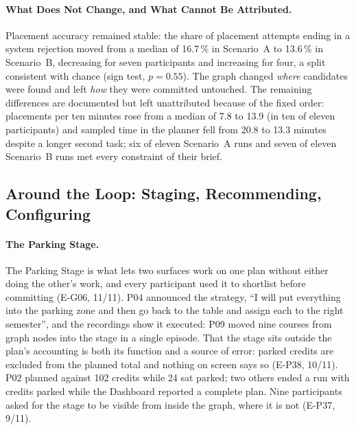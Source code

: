 \documentclass[a4paper,twoside]{article}
\begin{document}
\paragraph{What Does Not Change, and What Cannot Be Attributed.}
Placement accuracy remained stable: the share of placement attempts ending in a system rejection moved from a median of 16.7\,\% in Scenario~A to 13.6\,\% in Scenario~B, decreasing for seven participants and increasing for four, a split consistent with chance (sign test, $p=0.55$). The graph changed \emph{where} candidates were found and left \emph{how} they were committed untouched. The remaining differences are documented but left unattributed because of the fixed order: placements per ten minutes rose from a median of 7.8 to 13.9 (in ten of eleven participants) and sampled time in the planner fell from 20.8 to 13.3 minutes despite a longer second task; six of eleven Scenario~A runs and seven of eleven Scenario~B runs met every constraint of their brief.

\subsection{Around the Loop: Staging, Recommending, Configuring}

\paragraph{The Parking Stage.}
The Parking Stage is what lets two surfaces work on one plan without either doing the other's work, and every participant used it to shortlist before committing (E-G06, 11/11). P04 announced the strategy, ``I will put everything into the parking zone and then go back to the table and assign each to the right semester'', and the recordings show it executed: P09 moved nine courses from graph nodes into the stage in a single episode. That the stage sits outside the plan's accounting is both its function and a source of error: parked credits are excluded from the planned total and nothing on screen says so (E-P38, 10/11). P02 planned against 102 credits while 24 sat parked; two others ended a run with credits parked while the Dashboard reported a complete plan. Nine participants asked for the stage to be visible from inside the graph, where it is not (E-P37, 9/11).
\end{document}
